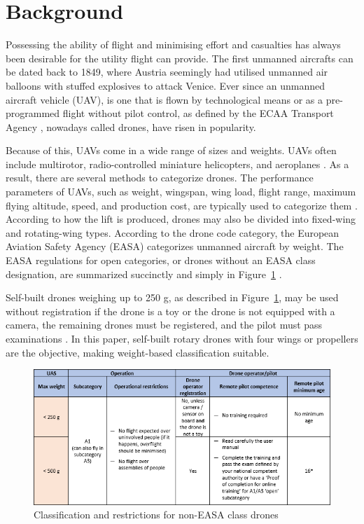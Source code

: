 \section{Background}

Possessing the ability of flight and minimising effort and casualties has always been desirable for the utility flight can provide.
The first unmanned aircrafts can be dated back to 1849, where Austria seemingly had utilised unmanned air balloons with stuffed explosives to attack Venice. \cite{Vyas2020}
Ever since an unmanned aircraft vehicle (UAV), is one that is flown by technological means or as a pre-programmed flight without pilot control, as defined by the ECAA Transport Agency \cite{Droner}, nowadays called drones, have risen in popularity.


Because of this, UAVs come in a wide range of sizes and weights.
UAVs often include multirotor, radio-controlled miniature helicopters, and aeroplanes \cite{Ann2012}.
As a result, there are several methods to categorize drones. The performance parameters of UAVs, such as weight, wingspan, wing load, flight range, maximum flying altitude, speed, and production cost, are typically used to categorize them \cite{Hassanalian2017}.
According to how the lift is produced, drones may also be divided into fixed-wing and rotating-wing types.
According to the drone code category, the European Aviation Safety Agency (EASA) categorizes unmanned aircraft by weight.
The EASA regulations for open categories, or drones without an EASA class designation, are summarized succinctly and simply in Figure~\ref{fig:Table} \cite{Euasa}.

Self-built drones weighing up to 250 g, as described in Figure~\ref{fig:Table}, may be used without registration if the drone is a toy or the drone is not equipped with a camera, the remaining drones must be registered, and the pilot must pass examinations \cite{Euasa}. In this paper, self-built rotary drones with four wings or propellers are the objective, making weight-based classification suitable.

\begin{figure}[H]
    \centering
    \includegraphics[scale = 0.9]{pictures/classification.PNG}
    \caption{Classification and restrictions for non-EASA class drones \cite{Euasa}}
    \label{fig:Table}
\end{figure}


